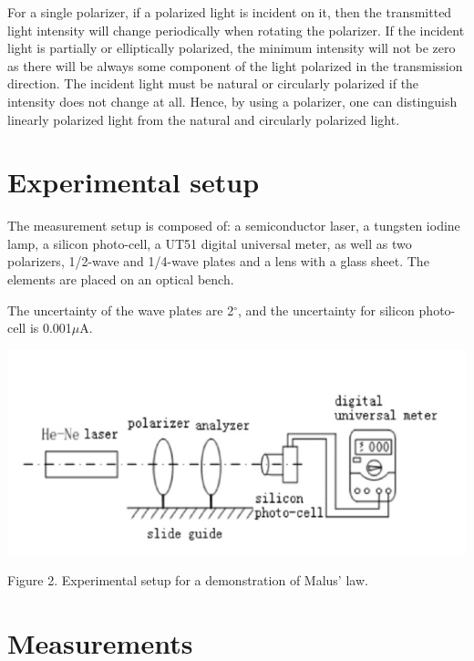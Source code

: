 \documentclass[12pt, a4paper]{article}
\begin{document}
For a single polarizer, if a polarized light is incident on it, then the transmitted light intensity 
will change periodically when rotating the polarizer. If the incident light is partially or elliptically 
polarized, the minimum intensity will not be zero as there will be always some component of the light 
polarized in the transmission direction. The incident light must be natural or circularly polarized 
if the intensity does not change at all. Hence, by using a polarizer, one can distinguish linearly polarized 
light from the natural and circularly polarized light.




\section{Experimental setup}

The measurement setup is composed of: a semiconductor laser, a tungsten iodine lamp, 
a silicon photo-cell, a UT51 digital universal meter, as well as two polarizers, 1/2-wave 
and 1/4-wave plates and a lens with a glass sheet. The elements are placed on an optical bench.

The uncertainty of the wave plates are 2$^{\circ}$, and the uncertainty for silicon photo-cell is 0.001$\mu$A.

\centerline{
	\includegraphics[scale = 0.6]{5.png}
}

\centerline{Figure 2. Experimental setup for a demonstration of Malus' law.}


\section{Measurements}
\end{document}
